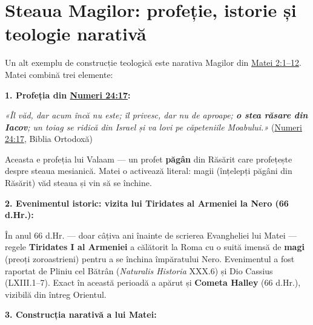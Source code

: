 \documentclass[12pt,a4paper,twoside,openany]{book}
\begin{document}
\chapter{Steaua Magilor: profeție, istorie și teologie narativă}\label{steaua}
Un alt exemplu de construcție teologică este narativa Magilor din \href{https://bibliaortodoxa.ro/carte.php?id=55\&cap=2\#1}{Matei 2:1–12}. Matei combină trei elemente:

\textbf{1. Profeția din \href{https://bibliaortodoxa.ro/carte.php?id=59\&cap=24\#17}{Numeri 24:17}:}


\begin{biblequote}
\textit{«Îl văd, dar acum încă nu este; îl privesc, dar nu de aproape; \textbf{o stea răsare din Iacov}; un toiag se ridică din Israel și va lovi pe căpeteniile Moabului.»} (\href{https://bibliaortodoxa.ro/carte.php?id=59\&cap=24\#17}{Numeri 24:17}, Biblia Ortodoxă)
\end{biblequote}
Aceasta e profeția lui Valaam — un profet \textbf{păgân} din Răsărit care profețește despre steaua mesianică. Matei o activează literal: magii (înțelepți păgâni din Răsărit) văd steaua și vin să se închine.

\textbf{2. Evenimentul istoric: vizita lui Tiridates al Armeniei la Nero (66 d.Hr.):}

În anul 66 d.Hr. — doar câțiva ani înainte de scrierea Evangheliei lui Matei — regele \textbf{Tiridates I al Armeniei} a călătorit la Roma cu o suită imensă de \textbf{magi} (preoți zoroastrieni) pentru a se închina împăratului Nero. Evenimentul a fost raportat de Pliniu cel Bătrân (\textit{Naturalis Historia} XXX.6) și Dio Cassius (LXIII.1–7). Exact în această perioadă a apărut și \textbf{Cometa Halley} (66 d.Hr.), vizibilă din întreg Orientul.

\textbf{3. Construcția narativă a lui Matei:}
\end{document}
